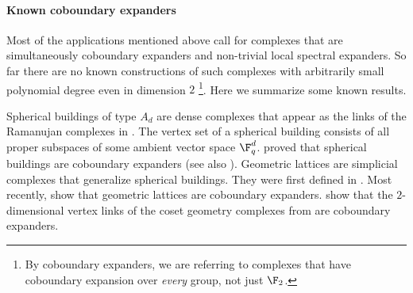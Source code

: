 %
%

\paragraph{Known coboundary expanders}
Most of the applications mentioned above call for complexes that are simultaneously coboundary expanders and non-trivial local spectral expanders. So far there are no known constructions of such complexes with arbitrarily small polynomial degree even in dimension $2$ \footnote{By coboundary expanders, we are referring to complexes that have coboundary expansion over \textit{every} group, not just \(\F_2\).}. Here we summarize some known results.

Spherical buildings of type \(A_d\) are dense complexes that appear as the links of the Ramanujan complexes in \cite{LubotzkySV2005}. The vertex set of a spherical building consists of all proper subspaces of some ambient vector space $\F_q^d$. \cite{Gromov2010} proved that spherical buildings are coboundary expanders (see also \cite{LubotzkyMM2016}).
Geometric lattices are simplicial complexes that generalize spherical buildings. They were first defined in \cite{KozlovM2019}.
Most recently, \cite{DiksteinD2023cbdry} show that geometric lattices are coboundary expanders.
\cite{KaufmanO2021} show that the $2$-dimensional vertex links of the coset geometry complexes from \cite{kaufmanO2018} are coboundary expanders.

